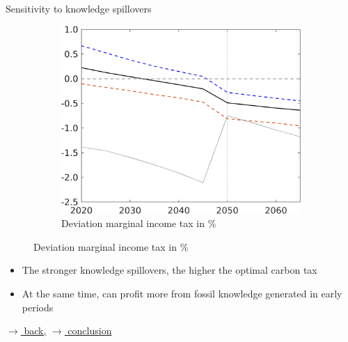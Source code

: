\documentclass[11pt,aspectratio=169]{beamer}
\begin{document}
\begin{frame}{Sensitivity to knowledge spillovers}
\begin{figure}[h!!]
				\begin{subfigure}{0.42\textwidth}		
					\caption{ Deviation marginal income tax in \%}
					\includegraphics[width=1\textwidth]{../codding_model/own_basedOnFried/optimalPol_010922_revision/figures/all_13Sept22/NewCalib_Sens_TvsNoT_dTaulAv_emnet1_Sun2_spillover0_knspil3_xgr0_nsk0_sep0_extern0_PV1_etaa0.79_lgd0.png}
				\end{subfigure}
			\end{figure}
			\vspace{2mm}
			\begin{block}{}
				\begin{itemize}
					\item The stronger knowledge spillovers, the higher the optimal carbon tax
					\item At the same time, can profit more from fossil knowledge generated in early periods
				\end{itemize}
			\end{block}	
			
			\vspace{-4mm}
			\hfill
			\hyperlink{backmec}{\tiny{$\rightarrow$ back,}}	\hyperlink{conc}{\tiny{$\rightarrow$ conclusion}}
		\end{frame}
\end{document}
